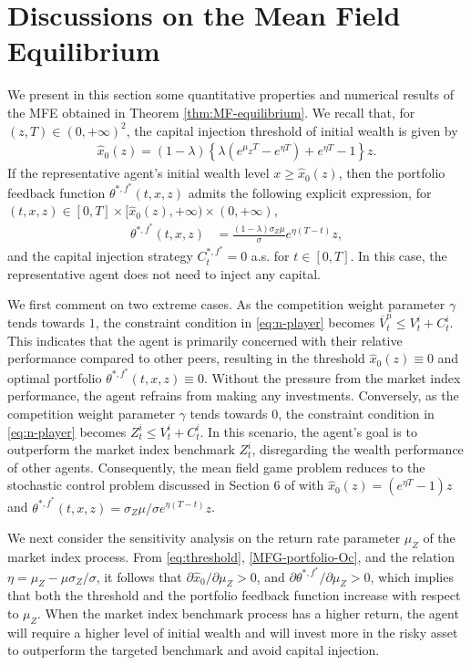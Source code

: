 \documentclass[11pt,times,letter]{article}
\numberwithin{equation}{section}
\begin{document}
\section{Discussions on the Mean Field Equilibrium}\label{sec:numerical}
We present in this section some quantitative properties and numerical results of the MFE obtained in Theorem \ref{thm:MF-equilibrium}. We recall that, for $(z,T)\in(0,+\infty)^2$, the capital injection threshold of initial wealth is given by
\begin{align}\label{eq:threshold}
\hat{x}_0(z)=(1-\lambda)\left\{\lambda\left(e^{\mu_Z T}-e^{\eta T}\right)+e^{\eta T}-1\right\}z.
\end{align} 
If the representative agent's initial wealth level $x\geq \hat{x}_0(z)$, then the portfolio feedback function $\theta^{*,f^*}(t,x,z)$ admits the following explicit expression, for $(t,x,z)\in[0,T]\times [\hat{x}_0(z),+\infty)\times (0,+\infty)$,
\begin{align}\label{MFG-portfolio-Oc}
\theta^{*,f^*}(t,x,z)&=\frac{(1-\lambda)\sigma_Z\mu}{\sigma}e^{\eta (T-t)}z,
\end{align}
and the capital injection strategy $C^{*,f^*}_t=0$ a.s. for $t\in[0,T]$. In this case, the representative agent does not need to inject any capital.

We first comment on two extreme cases.  As the competition weight parameter $\gamma$ tends towards $1$, the constraint condition in \eqref{eq:n-player} becomes  $\overline{V}_t^n \le V_t^{i}+C_t^{i}$. This indicates that the agent is primarily concerned with their relative performance compared to other peers, resulting in the threshold  $\hat{x}_0(z)\equiv 0$ and optimal portfolio $\theta^{*,f^*}(t,x,z)\equiv 0$. Without the pressure from the market index performance, the agent refrains from making any investments. Conversely, as the competition weight parameter $\gamma$ tends towards $0$, the constraint condition in \eqref{eq:n-player} becomes  $Z_t^i \le V_t^{i}+C_t^{i}$.  In this scenario, the agent's goal is to outperform the market index benchmark $Z_t^i$, disregarding the wealth performance of other agents. Consequently, the mean field game problem reduces to the stochastic control problem discussed in Section 6 of  \cite{BoLiaoYu21} with $\hat{x}_0(z)=(e^{\eta T}-1)z$ and $\theta^{*,f^*}(t,x,z)=\sigma_Z\mu/\sigma e^{\eta (T-t)}z$.

We next consider the sensitivity analysis on the return rate parameter $\mu_Z$ of the market index process. From \eqref{eq:threshold}, \eqref{MFG-portfolio-Oc}, and the relation $\eta=\mu_Z-\mu\sigma_Z/\sigma$, it follows that $\partial \hat{x}_0/\partial \mu_Z>0$,  and  $\partial \theta^{*,f^*}/\partial \mu_Z>0$, which implies that both the threshold  and the portfolio feedback function increase with respect to $\mu_Z$. When the market index benchmark process has a higher return, the agent will require a higher level of initial wealth and will invest more in the risky asset to outperform the targeted benchmark and avoid capital injection.
\end{document}
